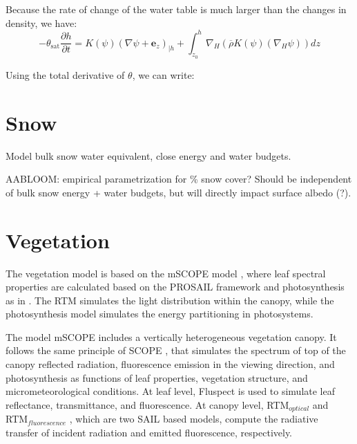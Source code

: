 \documentclass{report}
\begin{document}
Because the rate of change of the water table is much larger than the changes in density, we have: 
\begin{equation}
-	\theta_{\mathrm{sat}} \frac{\partial h}{\partial t} = 
 K(\psi) \left(\nabla \psi + {\mathbf e_z} \right)_{|h}  + \int_{z_0}^h  \nabla_H \left( {\overline \rho} K(\psi) \left(\nabla_H \psi \right) \right) dz
\end{equation}

Using the total derivative of $\theta$, we can write:









\chapter{Snow}

Model bulk snow water equivalent, close energy and water budgets.

AABLOOM: empirical parametrization for \% snow cover? Should be independent of bulk snow energy + water budgets, but will directly impact surface albedo (?).

\chapter{Vegetation}



The vegetation model is based on the mSCOPE model \citep{Yang2017}, where leaf spectral properties are calculated based on the PROSAIL framework \citep{Jacquemoud2009} and photosynthesis as in \citet{Farquhar1980}. The RTM simulates the light distribution within the canopy, while the photosynthesis model simulates the energy partitioning in photosystems.

The model mSCOPE includes a vertically heterogeneous vegetation canopy. It follows the same principle of SCOPE \citep{VanderTol2009}, that simulates the spectrum of top of the canopy reflected radiation, fluorescence emission in the viewing direction, and photosynthesis as functions of leaf properties, vegetation structure, and micrometeorological conditions. %
At leaf level, Fluspect \citep{Vilfan2016} is used to simulate leaf reflectance, transmittance, and fluorescence. At canopy level, RTM$_{optical}$ and RTM$_{fluorescence}$ \citep{VanderTol2016}, which are two SAIL \citep{Verhoef1984,Verhoef1985} based models, compute the radiative transfer of incident radiation and emitted fluorescence, respectively. 
\end{document}
